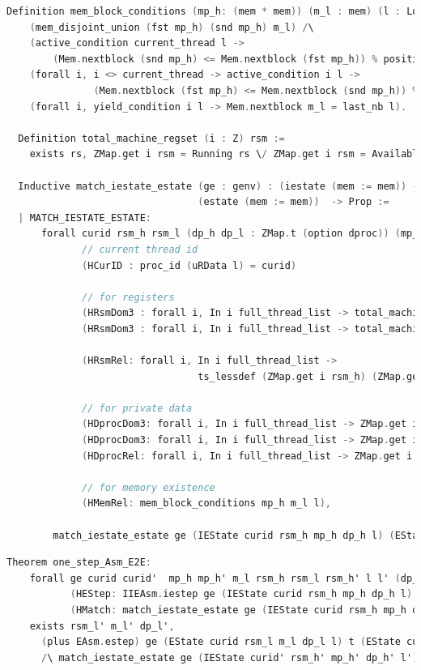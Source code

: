\begin{lstlisting}[language=C]
  Definition mem_block_conditions (mp_h: (mem * mem)) (m_l : mem) (l : Log) : Prop :=
    (mem_disjoint_union (fst mp_h) (snd mp_h) m_l) /\
    (active_condition current_thread l -> 
        (Mem.nextblock (snd mp_h) <= Mem.nextblock (fst mp_h)) % positive) /\
    (forall i, i <> current_thread -> active_condition i l -> 
               (Mem.nextblock (fst mp_h) <= Mem.nextblock (snd mp_h)) % positive) /\
    (forall i, yield_condition i l -> Mem.nextblock m_l = last_nb l).
  
  Definition total_machine_regset (i : Z) rsm :=
    exists rs, ZMap.get i rsm = Running rs \/ ZMap.get i rsm = Available.

  Inductive match_iestate_estate (ge : genv) : (iestate (mem := mem)) -> 
                                 (estate (mem := mem))  -> Prop :=  
  | MATCH_IESTATE_ESTATE:
      forall curid rsm_h rsm_l (dp_h dp_l : ZMap.t (option dproc)) (mp_h: (mem * mem)) m_l l
             // current thread id 
             (HCurID : proc_id (uRData l) = curid)

             // for registers 
             (HRsmDom3 : forall i, In i full_thread_list -> total_machine_regset i rsm_h)
             (HRsmDom3 : forall i, In i full_thread_list -> total_machine_regset i rsm_l)
             
             (HRsmRel: forall i, In i full_thread_list ->
                                 ts_lessdef (ZMap.get i rsm_h) (ZMap.get i rsm_l))
             
             // for private data 
             (HDprocDom3: forall i, In i full_thread_list -> ZMap.get i dp_h <> None)
             (HDprocDom3: forall i, In i full_thread_list -> ZMap.get i dp_l <> None)
             (HDprocRel: forall i, In i full_thread_list -> ZMap.get i dp_h = ZMap.get i dp_l)

             // for memory existence 
             (HMemRel: mem_block_conditions mp_h m_l l),
        
        match_iestate_estate ge (IEState curid rsm_h mp_h dp_h l) (EState curid rsm_l m_l dp_l l).
\end{lstlisting}

\begin{lstlisting}[language=C]
  Theorem one_step_Asm_E2E:
    forall ge curid curid'  mp_h mp_h' m_l rsm_h rsm_l rsm_h' l l' (dp_h dp_l dp_h' : ZMap.t (option dproc)) t
           (HEStep: IIEAsm.iestep ge (IEState curid rsm_h mp_h dp_h l) t (IEState curid' rsm_h' mp_h' dp_h' l'))
           (HMatch: match_iestate_estate ge (IEState curid rsm_h mp_h dp_h l) (EState curid rsm_l m_l dp_l l)),
    exists rsm_l' m_l' dp_l',
      (plus EAsm.estep) ge (EState curid rsm_l m_l dp_l l) t (EState curid' rsm_l' m_l' dp_l' l')
      /\ match_iestate_estate ge (IEState curid' rsm_h' mp_h' dp_h' l') (EState curid' rsm_l' m_l' dp_l' l').
\end{lstlisting}

